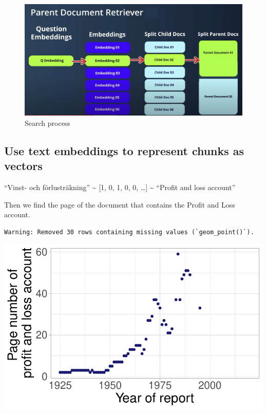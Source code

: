 \documentclass[
  letterpaper,
  DIV=11,
  numbers=noendperiod]{scrartcl}
\begin{document}
\begin{figure}

{\centering \includegraphics{assets/parent-document-retriever.png}

}

\caption{Search process}

\end{figure}

\hypertarget{use-text-embeddings-to-represent-chunks-as-vectors}{%
\subsection{Use text embeddings to represent chunks as
vectors}\label{use-text-embeddings-to-represent-chunks-as-vectors}}

``Vinst- och förlusträkning'' \textasciitilde{} {[}1, 0, 1, 0, 0,
\ldots{]} \textasciitilde{} ``Profit and loss account''

Then we find the page of the document that contains the Profit and Loss
account.

\begin{verbatim}
Warning: Removed 30 rows containing missing values (`geom_point()`).
\end{verbatim}

\includegraphics{index_files/figure-pdf/unnamed-chunk-2-1.pdf}
\end{document}
